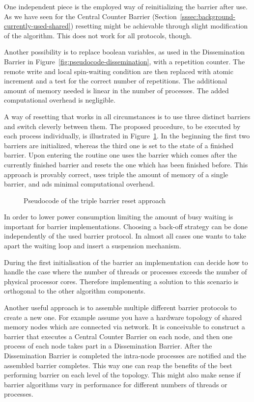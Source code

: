 \documentclass[a4paper, 10pt]{article}
\begin{document}
One independent piece is the employed way of reinitializing the barrier after use. As we have seen for the Central Counter Barrier (Section~\ref{sssec:background-currently-used-shared}) resetting might be achievable through slight modification of the algorithm. This does not work for all protocols, though.

Another possibility is to replace boolean variables, as used in the Dissemination Barrier in Figure~\ref{fig:pseudocode-dissemination}, with a repetition counter. The remote write and local spin-waiting condition are then replaced with atomic increment and a test for the correct number of repetitions. The additional amount of memory needed is linear in the number of processes. The added computational overhead is negligible.

A way of resetting that works in all circumstances is to use three distinct barriers and switch cleverly between them. The proposed procedure, to be executed by each process individually, is illustrated in Figure~\ref{fig:pseudocode-triple-reset}. In the beginning the first two barriers are initialized, whereas the third one is set to the state of a finished barrier. Upon entering the routine one uses the barrier which comes after the currently finished barrier and resets the one which has been finished before. This approach is provably correct, uses triple the amount of memory of a single barrier, and ads minimal computational overhead.

\begin{figure}[htpb]
	\centering
	
	\caption{Pseudocode of the triple barrier reset approach}
	\label{fig:pseudocode-triple-reset}
\end{figure}

In order to lower power consumption limiting the amount of busy waiting is important for barrier implementations. Choosing a back-off strategy can be done independently of the used barrier protocol. In almost all cases one wants to take apart the waiting loop and insert a suspension mechanism.

During the first initialisation of the barrier an implementation can decide how to handle the case where the number of threads or processes exceeds the number of physical processor cores. Therefore implementing a solution to this scenario is orthogonal to the other algorithm components.

Another useful approach is to assemble multiple different barrier protocols to create a new one. For example assume you have a hardware topology of shared memory nodes which are connected via network. It is conceivable to construct a barrier that executes a Central Counter Barrier on each node, and then one process of each node takes part in a Dissemination Barrier. After the Dissemination Barrier is completed the intra-node processes are notified and the assembled barrier completes.
This way one can reap the benefits of the best performing barrier on each level of the topology.
This might also make sense if barrier algorithms vary in performance for different numbers of threads or processes.
\end{document}
